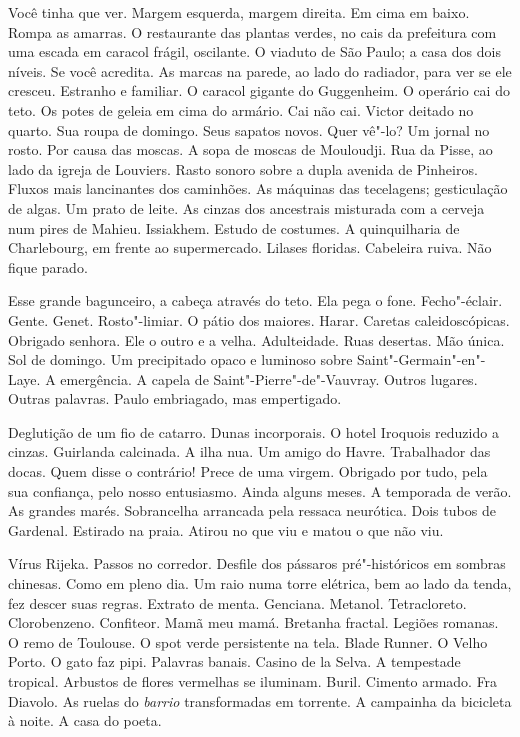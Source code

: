Você tinha que ver. Margem esquerda, margem direita. Em cima em baixo. 
Rompa as amarras. O restaurante das plantas verdes, no cais da
prefeitura com uma escada em caracol frágil, oscilante. O viaduto de São
Paulo; a casa dos dois níveis. Se você acredita. As marcas na parede, ao
lado do radiador, para ver se ele cresceu. Estranho e familiar. O
caracol gigante do Guggenheim. O operário cai do teto. Os potes de
geleia em cima do armário. Cai não cai. Victor deitado no quarto. Sua
roupa de domingo. Seus sapatos novos. Quer vê"-lo? Um jornal no rosto.
Por causa das moscas. A sopa de moscas de Mouloudji. Rua da Pisse, ao
lado da igreja de Louviers. Rasto sonoro sobre a dupla avenida de
Pinheiros. Fluxos mais lancinantes dos caminhões. As máquinas das
tecelagens; gesticulação de algas. Um prato de leite. As cinzas dos
ancestrais misturada com a cerveja num pires de Mahieu. Issiakhem.
Estudo de costumes. A quinquilharia de Charlebourg, em frente ao
supermercado. Lilases floridas. Cabeleira ruiva. Não fique parado.

Esse grande bagunceiro, a cabeça através do teto. Ela pega o fone.
Fecho"-éclair. Gente. Genet. Rosto"-limiar. O pátio dos maiores. Harar.
Caretas caleidoscópicas. Obrigado senhora. Ele o outro e a velha.
Adulteidade. Ruas desertas. Mão única. Sol de domingo. Um precipitado
opaco e luminoso sobre Saint"-Germain"-en"-Laye. A emergência. A capela de
Saint"-Pierre"-de"-Vauvray. Outros lugares. Outras palavras. Paulo
embriagado, mas empertigado.

Deglutição de um fio de catarro. Dunas incorporais. O hotel Iroquois
reduzido a cinzas. Guirlanda calcinada. A ilha nua. Um amigo do Havre.
Trabalhador das docas. Quem disse o contrário! Prece de uma virgem.
Obrigado por tudo, pela sua confiança, pelo nosso entusiasmo. Ainda
alguns meses. A temporada de verão. As grandes marés. Sobrancelha
arrancada pela ressaca neurótica. Dois tubos de Gardenal. Estirado na
praia. Atirou no que viu e matou o que não viu.

Vírus Rijeka. Passos no corredor. Desfile dos pássaros pré"-históricos em
sombras chinesas. Como em pleno dia. Um raio numa torre elétrica, bem ao
lado da tenda, fez descer suas regras. Extrato de menta. Genciana.
Metanol. Tetracloreto. Clorobenzeno. Confiteor. Mamã meu mamá. Bretanha
fractal. Legiões romanas. O remo de Toulouse. O spot verde persistente
na tela. Blade Runner. O Velho Porto. O gato faz pipi. Palavras banais.
Casino de la Selva. A tempestade tropical. Arbustos de flores vermelhas
se iluminam. Buril. Cimento armado. Fra Diavolo. As ruelas do
\emph{barrio} transformadas em torrente. A campainha da bicicleta à
noite. A casa do poeta.

